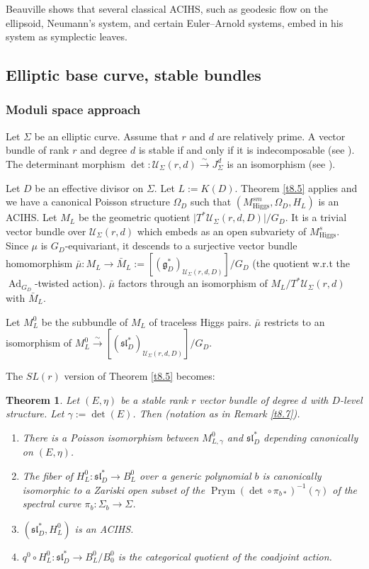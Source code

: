 \documentclass[12pt,a4paper,oneside,english]{smfart}
\newtheorem{thm}{Theorem}[section]
\theoremstyle{definition}
\theoremstyle{remark}
\DeclareMathOperator{\Ad}{Ad}
\DeclareMathOperator{\Prym}{Prym}
\newcommand{\Hig}{\mathrm{Higgs}}
\newcommand{\MHs}{M^{s}_{\Hig}}
\newcommand{\cU}{\mathcal{U}}
\newcommand{\tot}[1]{\lvert #1 \rvert}
\begin{document}
Beauville shows that several classical ACIHS, such as geodesic flow on the ellipsoid, Neumann's system, and certain Euler--Arnold systems, embed in his system as symplectic leaves.

\subsection{Elliptic base curve, stable bundles}\label{sec:9.2}

\subsubsection{Moduli space approach}\label{sec:9.2.1}

Let $\Sigma$ be an elliptic curve. Assume that $r$ and $d$ are relatively prime. A vector bundle of rank $r$ and degree $d$ is stable if and only if it is indecomposable (see \cite{Tu}). The determinant morphism $\det \colon \cU_\Sigma(r, d) \xrightarrow{\sim} J_\Sigma^d$ is an isomorphism (see \cite{At}).

Let $D$ be an effective divisor on $\Sigma$. Let $L := K(D)$. Theorem \ref{t8.5} applies and we have a canonical Poisson structure $\Omega_D$ such that $(M^{sm}_{\Hig}, \Omega_D, H_L)$ is an ACIHS. Let $M_L$ be the geometric quotient $\tot{T^*\cU_\Sigma(r, d, D)}/G_D$. It is a trivial vector bundle over $\cU_\Sigma(r, d)$ which embeds as an open subvariety of $\MHs$. Since $\mu$ is $G_D$-equivariant, it descends to a surjective vector bundle homomorphism $\bar{\mu} \colon M_L \to \bar{M}_L := [(\mathfrak{g}_D^*)_{\cU_\Sigma(r, d, D)}]/G_D$ (the quotient w.r.t the $\Ad_{G_D}$-twisted action). $\bar{\mu}$ factors through an isomorphism of $M_L/T^*\cU_\Sigma(r, d)$ with $\bar{M}_L$.

Let $M_L^0$ be the subbundle of $M_L$ of traceless Higgs pairs. $\bar{\mu}$ restricts to an isomorphism of $M_L^0 \xrightarrow{\sim} [(\mathfrak{sl}_D^*)_{\cU_\Sigma(r, d, D)}]/G_D$.

The $SL(r)$ version of Theorem \ref{t8.5} becomes:

\begin{thm}\label{t9.2}
Let $(E, \eta)$ be a stable rank $r$ vector bundle of degree $d$ with $D$-level structure. Let $\gamma := \det(E)$. Then (notation as in Remark \ref{t8.7}).
\begin{enumerate}
    \item There is a Poisson isomorphism between $M^0_{L, \gamma}$ and $\mathfrak{sl}_D^*$ depending canonically on $(E, \eta)$.
    \item The fiber of $H_L^0 \colon \mathfrak{sl}_D^* \to B_L^0$ over a generic polynomial $b$ is canonically isomorphic to a Zariski open subset of the $\Prym(\det \circ \pi_{b*})^{-1}(\gamma)$ of the spectral curve $\pi_b \colon \Sigma_b \to \Sigma$.
    \item $(\mathfrak{sl}_D^*, H_L^0)$ is an ACIHS.
    \item $q^0 \circ H_L^0 \colon \mathfrak{sl}_D^* \to B_L^0/B_0^0$ is the categorical quotient of the coadjoint action.
\end{enumerate}
\end{thm}
\end{document}
